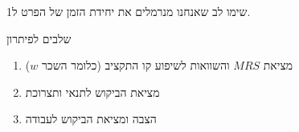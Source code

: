 \documentclass{beamer}
\begin{document}
\begin{RTL}
\begin{frame}[allowframebreaks]
    שימו לב שאנחנו מנרמלים את יחידת הזמן של הפרט ל1.

    \framebreak

    \begin{exampleblock}{שלבים לפיתרון}
        \begin{enumerate}
            \item מציאת $MRS$ והשוואות לשיפוע קו התקציב (כלומר השכר $w$)
            \item מציאת הביקוש לתנאי ותצרוכת
            \item הצבה ומציאת הביקוש לעבודה
        \end{enumerate}
    \end{exampleblock}

    

\end{frame}
\end{RTL}
\end{document}
